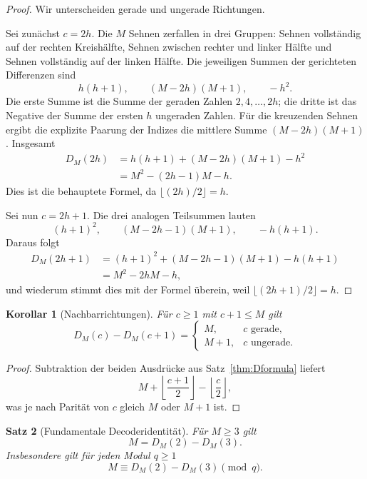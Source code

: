 \documentclass[11pt,a4paper]{article}
\newtheorem{satz}{Satz}[section]
\newtheorem{korollar}[satz]{Korollar}
\theoremstyle{definition}
\theoremstyle{remark}
\begin{document}
\begin{proof}
Wir unterscheiden gerade und ungerade Richtungen.

Sei zunächst $c=2h$. Die $M$ Sehnen zerfallen in drei Gruppen: Sehnen vollständig auf der rechten Kreishälfte, Sehnen zwischen rechter und linker Hälfte und Sehnen vollständig auf der linken Hälfte. Die jeweiligen Summen der gerichteten Differenzen sind
\[
h(h+1),\qquad (M-2h)(M+1),\qquad -h^2.
\]
Die erste Summe ist die Summe der geraden Zahlen $2,4,\ldots,2h$; die dritte ist das Negative der Summe der ersten $h$ ungeraden Zahlen. Für die kreuzenden Sehnen ergibt die explizite Paarung der Indizes die mittlere Summe $(M-2h)(M+1)$. Insgesamt
\begin{align*}
D_M(2h)
&=h(h+1)+(M-2h)(M+1)-h^2\\
&=M^2-(2h-1)M-h.
\end{align*}
Dies ist die behauptete Formel, da $\lfloor(2h)/2\rfloor=h$.

Sei nun $c=2h+1$. Die drei analogen Teilsummen lauten
\[
(h+1)^2,\qquad (M-2h-1)(M+1),\qquad -h(h+1).
\]
Daraus folgt
\begin{align*}
D_M(2h+1)
&=(h+1)^2+(M-2h-1)(M+1)-h(h+1)\\
&=M^2-2hM-h,
\end{align*}
und wiederum stimmt dies mit der Formel überein, weil $\lfloor(2h+1)/2\rfloor=h$.
\end{proof}

\begin{korollar}[Nachbarrichtungen]\label{cor:adjacent}
Für $c\ge1$ mit $c+1\le M$ gilt
\[
\boxed{
D_M(c)-D_M(c+1)=
\begin{cases}
M,&c\text{ gerade},\\
M+1,&c\text{ ungerade}.
\end{cases}}
\]
\end{korollar}

\begin{proof}
Subtraktion der beiden Ausdrücke aus Satz~\ref{thm:Dformula} liefert
\[
M+\left\lfloor\frac{c+1}{2}\right\rfloor-\left\lfloor\frac c2\right\rfloor,
\]
was je nach Parität von $c$ gleich $M$ oder $M+1$ ist.
\end{proof}

\begin{satz}[Fundamentale Decoderidentität]\label{thm:decoder}
Für $M\ge3$ gilt
\[
\boxed{M=D_M(2)-D_M(3).}
\]
Insbesondere gilt für jeden Modul $q\ge1$
\[
\boxed{M\equiv D_M(2)-D_M(3)\pmod q.}
\]
\end{satz}
\end{document}
